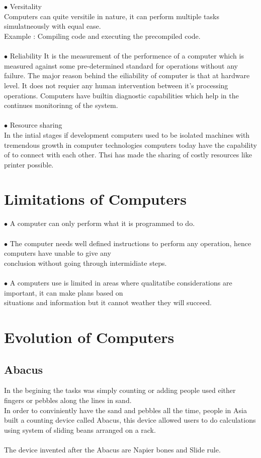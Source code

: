 \documentclass{article}
\begin{document}
	\\ \\
	$\bullet$ Versitality \\
	Computers can quite versitile in nature, it can perform multiple tasks simulatneously with equal ease. \\
	Example : Compiling code and executing the precompiled code.
	\\ \\
	$\bullet$ Reliability
	It is the measurement of the performence of a computer which is measured against some pre-determined standard for operations without any failure. The major reason behind the eiliability of computer is that at hardware level. It does not requier any human intervention between it's processing operations. Computers have builtin diagnostic capabilities which help in the continues monitorinng of the system.
	\\ \\
	$\bullet$ Resource sharing \\
	In the intial stages if development computers used to be isolated machines with tremendous growth in computer technologies computers today have the capability of to connect with each other. Thsi has made the sharing of costly resources like printer possible.
	
	\section{Limitations of Computers}
	$ \bullet $ A computer can only perform what it is programmed to do. 
	\\ \\
	$ \bullet $ The computer needs well defined instructions to perform any operation, hence computers have unable to give any \\ \tabto{0.35cm} conclusion without going through intermidiate steps. 
	\\ \\
	$ \bullet $ A computers use is limited in areas where qualitatibe considerations are important, it can make plans based on \\ \tabto{0.35cm} situations and information but it cannot weather they will succeed.
	
	\newpage
	
	\section{Evolution of Computers}
	\subsection{Abacus}
	In the begining the tasks was simply counting or adding people used either fingers or pebbles along the lines in sand. \\
	In order to conviniently have the sand and pebbles all the time, people in Asia built a counting device called Abacus, this device allowed users to do calculations using system of sliding beans arranged on a rack. 
	\\ \\
	The device invented after the Abacus are Napier bones and Slide rule. 
	
\end{document}
